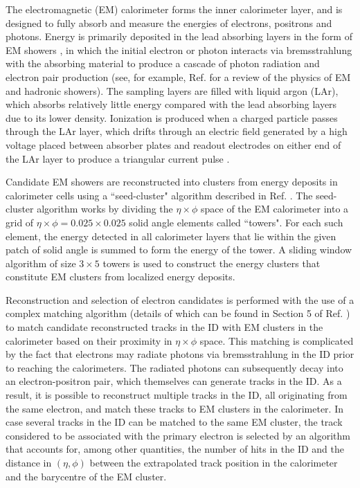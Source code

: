 The electromagnetic (EM) calorimeter forms the inner calorimeter layer, and is designed to fully absorb and measure the energies of electrons, positrons and photons. Energy is primarily deposited in the lead absorbing layers in the form of EM showers \cite{em_showers}, in which the initial electron or photon interacts via bremsstrahlung with the absorbing material to produce a cascade of photon radiation and electron pair production (see, for example, Ref. \cite{shower_theory} for a review of the physics of EM and hadronic showers). The sampling layers are filled with liquid argon (LAr), which absorbs relatively little energy compared with the lead absorbing layers due to its lower density. Ionization is produced when a charged particle passes through the LAr \cite{em_cal} layer, which drifts through an electric field generated by a high voltage placed between absorber plates and readout electrodes on either end of the LAr layer to produce a triangular current pulse \cite{LAr_calo}. 

Candidate EM showers are reconstructed into clusters from energy deposits in calorimeter cells using a ``seed-cluster" algorithm described in Ref. \cite{electron_reco}. The seed-cluster algorithm works by dividing the \(\eta\times\phi\) space of the EM calorimeter into a grid of \(\eta\times\phi=0.025\times0.025\) solid angle elements called ``towers". For each such element, the energy detected in all calorimeter layers that lie within the given patch of solid angle is summed to form the energy of the tower. A sliding window algorithm of size \(3\times5\) towers is used to construct the energy clusters that constitute EM clusters from localized energy deposits.

Reconstruction and selection of electron candidates is performed with the use of a complex matching algorithm (details of which can be found in Section 5 of Ref. \cite{electron_reco}) to match candidate reconstructed tracks in the ID with EM clusters in the calorimeter based on their proximity in \(\eta\times\phi\) space. This matching is complicated by the fact that electrons may radiate photons via bremsstrahlung in the ID prior to reaching the calorimeters. The radiated photons can subsequently decay into an electron-positron pair, which themselves can generate tracks in the ID. As a result, it is possible to reconstruct multiple tracks in the ID, all originating from the same electron, and match these tracks to EM clusters in the calorimeter. In case several tracks in the ID can be matched to the same EM cluster, the track considered to be associated with the primary electron is selected by an algorithm that accounts for, among other quantities, the number of hits in the ID and the distance in \((\eta, \phi)\) between the extrapolated track position in the calorimeter and the barycentre of the EM cluster. 

